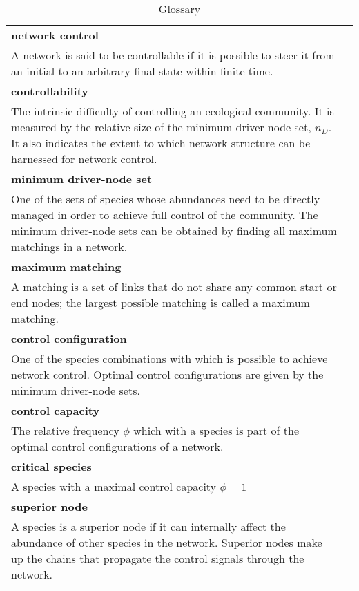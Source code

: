 \documentclass[a4paper]{artikel1}
\theoremstyle{definition}
\theoremstyle{definition}
\theoremstyle{definition}
\theoremstyle{remark}
\begin{document}
\begin{table}

\caption{\label{tab:tab-glossary}Glossary}
\centering
\fontsize{8}{10}\selectfont
\begin{tabular}[t]{>{\raggedright\arraybackslash}p{3.4in}l}
\toprule
\textbf{network control} & \\
\hspace{1em}A network is said to be controllable if it is possible to steer it from an initial to an arbitrary final state within finite time. & \\
\addlinespace
\textbf{controllability} & \\
\hspace{1em}The intrinsic difficulty of controlling an ecological community. It is measured by the relative size of the minimum driver-node set, $n_D$. It also indicates the extent to which network structure can be harnessed for network control. & \\
\addlinespace
\textbf{minimum driver-node set} & \\
\hspace{1em}One of the sets of species whose abundances need to be directly managed in order to achieve full control of the community. The minimum driver-node sets can be obtained by finding all maximum matchings in a network. & \\
\addlinespace
\textbf{maximum matching} & \\
\hspace{1em}A matching is a set of links that do not share any common start or end nodes; the largest possible matching is called a maximum matching. & \\
\addlinespace
\textbf{control configuration} & \\
\hspace{1em}One of the species combinations with which is possible to achieve network control. Optimal control configurations are given by the minimum driver-node sets. & \\
\addlinespace
\textbf{control capacity} & \\
\hspace{1em}The relative frequency \(\phi\) which with a species is part of the optimal control configurations of a network. & \\
\addlinespace
\textbf{critical species} & \\
\hspace{1em}A species with a maximal control capacity \(\phi=1\) & \\
\addlinespace
\textbf{superior node} & \\
\hspace{1em}A species is a superior node if it can internally affect the abundance of other species in the network. Superior nodes make up the chains that propagate the control signals through the network. & \\
\bottomrule
\end{tabular}
\end{table}
\end{document}
